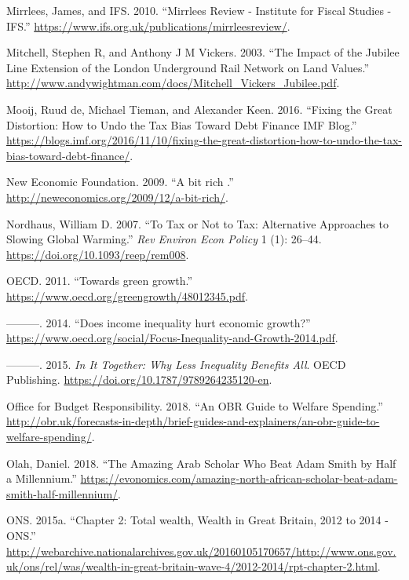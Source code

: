 \documentclass[]{tufte-handout}
\begin{document}
\leavevmode\hypertarget{ref-Mirrlees2010}{}%
Mirrlees, James, and IFS. 2010. ``Mirrlees Review - Institute for Fiscal
Studies - IFS.''
\url{https://www.ifs.org.uk/publications/mirrleesreview/}.

\leavevmode\hypertarget{ref-Mitchell}{}%
Mitchell, Stephen R, and Anthony J M Vickers. 2003. ``The Impact of the
Jubilee Line Extension of the London Underground Rail Network on Land
Values.''
\url{http://www.andywightman.com/docs/Mitchell_Vickers_Jubilee.pdf}.

\leavevmode\hypertarget{ref-DeMooij2016}{}%
Mooij, Ruud de, Michael Tieman, and Alexander Keen. 2016. ``Fixing the
Great Distortion: How to Undo the Tax Bias Toward Debt Finance
\textbar{} IMF Blog.''
\url{https://blogs.imf.org/2016/11/10/fixing-the-great-distortion-how-to-undo-the-tax-bias-toward-debt-finance/}.

\leavevmode\hypertarget{ref-NewEconomicFoundation2009}{}%
New Economic Foundation. 2009. ``A bit rich \textbar{}.''
\url{http://neweconomics.org/2009/12/a-bit-rich/}.

\leavevmode\hypertarget{ref-Nordhaus2007}{}%
Nordhaus, William D. 2007. ``To Tax or Not to Tax: Alternative
Approaches to Slowing Global Warming.'' \emph{Rev Environ Econ Policy} 1
(1): 26--44. \url{https://doi.org/10.1093/reep/rem008}.

\leavevmode\hypertarget{ref-OECD2011}{}%
OECD. 2011. ``Towards green growth.''
\url{https://www.oecd.org/greengrowth/48012345.pdf}.

\leavevmode\hypertarget{ref-OE2014}{}%
---------. 2014. ``Does income inequality hurt economic growth?''
\url{https://www.oecd.org/social/Focus-Inequality-and-Growth-2014.pdf}.

\leavevmode\hypertarget{ref-OECD2015}{}%
---------. 2015. \emph{In It Together: Why Less Inequality Benefits
All}. OECD Publishing. \url{https://doi.org/10.1787/9789264235120-en}.

\leavevmode\hypertarget{ref-OBR2018}{}%
Office for Budget Responsibility. 2018. ``An OBR Guide to Welfare
Spending.''
\url{http://obr.uk/forecasts-in-depth/brief-guides-and-explainers/an-obr-guide-to-welfare-spending/}.

\leavevmode\hypertarget{ref-Olah2018}{}%
Olah, Daniel. 2018. ``The Amazing Arab Scholar Who Beat Adam Smith by
Half a Millennium.''
\url{https://evonomics.com/amazing-north-african-scholar-beat-adam-smith-half-millennium/}.

\leavevmode\hypertarget{ref-ONS2015}{}%
ONS. 2015a. ``Chapter 2: Total wealth, Wealth in Great Britain, 2012 to
2014 - ONS.''
\url{http://webarchive.nationalarchives.gov.uk/20160105170657/http://www.ons.gov.uk/ons/rel/was/wealth-in-great-britain-wave-4/2012-2014/rpt-chapter-2.html}.
\end{document}
